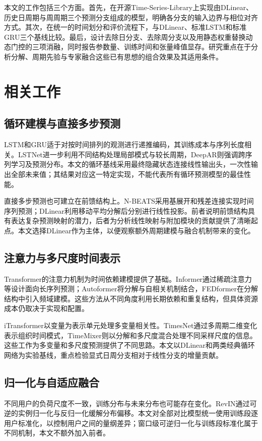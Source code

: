 \documentclass[UTF8,a4paper,zihao=5,fontset=windows]{ctexart}
\begin{document}
本文的工作包括三个方面。首先，在开源Time-Series-Library上实现由DLinear、历史日周期与周周期三个预测分支组成的模型，明确各分支的输入边界与相位对齐方式。其次，在统一的时间划分和评价流程下，与DLinear、标准LSTM和标准GRU三个基线比较。最后，设计去除日分支、去除周分支以及用静态权重替换动态门控的三项消融，同时报告参数量、训练时间和张量峰值显存。研究重点在于分析分解、周期先验与专家融合这些已有思想的组合效果及其适用条件。

\section{相关工作}
\subsection{循环建模与直接多步预测}
LSTM和GRU适于对按时间排列的观测进行递推编码，其训练成本与序列长度相关\cite{hochreiter1997lstm,cho2014gru}。LSTNet进一步利用不同结构处理局部模式与较长周期\cite{lai2018lstnet}，DeepAR则强调跨序列学习及预测分布\cite{salinas2017deepar}。本文的循环基线采用最终隐藏状态连接线性输出头，一次性输出全部未来值；其结果对应这一特定实现，不能代表所有循环预测模型的最佳性能。

直接多步预测也可建立在前馈结构上。N-BEATS采用基展开和残差连接实现时间序列预测\cite{oreshkin2020nbeats}；DLinear利用移动平均分解后分别进行线性投影\cite{zeng2023dlinear}。前者说明前馈结构具有表达复杂预测映射的潜力，后者为分析线性映射与附加模块的贡献提供了清晰起点。本文选择DLinear作为主体，以便观察额外周期建模与融合机制带来的变化。

\subsection{注意力与多尺度时间表示}
Transformer的注意力机制为时间依赖建模提供了基础\cite{vaswani2017attention}。Informer通过稀疏注意力等设计面向长序列预测\cite{zhou2021informer}；Autoformer将分解与自相关机制结合\cite{wu2021autoformer}，FEDformer在分解结构中引入频域建模\cite{zhou2022fedformer}。这些方法从不同角度利用长期依赖和重复结构，但具体资源成本仍取决于实现和配置。

iTransformer以变量为表示单元处理多变量相关性\cite{liu2024itransformer}。TimesNet通过多周期二维变化表示组织时间模式\cite{wu2023timesnet}，TimeMixer则以分解和多尺度混合处理不同采样尺度的信息\cite{wang2024timemixer}。这些工作为多变量和多尺度预测提供了不同思路。本文以DLinear和两类经典循环网络为实验基线，重点检验显式日周分支相对于线性分支的增量贡献。

\subsection{归一化与自适应融合}
不同用户的负荷尺度不一致，训练分布与未来分布也可能存在变化。RevIN通过可逆的实例归一化与反归一化缓解分布偏移\cite{kim2022revin}。本文对全部对比模型统一使用训练段逐用户标准化，以控制用户之间的量纲差异；窗口级可逆归一化与训练段标准化属于不同机制，本文不额外加入前者。
\end{document}
